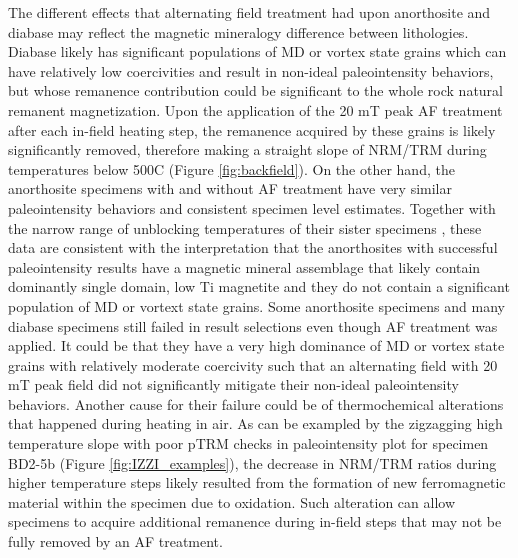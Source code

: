 \documentclass[draft]{agujournal2019}
\begin{document}
The different effects that alternating field treatment had upon anorthosite and diabase may reflect the magnetic mineralogy difference between lithologies. Diabase likely has significant populations of MD or vortex state grains which can have relatively low coercivities and result in non-ideal paleointensity behaviors, but whose remanence contribution could be significant to the whole rock natural remanent magnetization. Upon the application of the 20 mT peak AF treatment after each in-field heating step, the remanence acquired by these grains is likely significantly removed, therefore making a straight slope of NRM/TRM during temperatures below 500\textdegree C (Figure \ref{fig:backfield}). On the other hand, the anorthosite specimens with and without AF treatment have very similar paleointensity behaviors and consistent specimen level estimates. Together with the narrow range of unblocking temperatures of their sister specimens \cite{Zhang2021b}, these data are consistent with the interpretation that the anorthosites with successful paleointensity results have a magnetic mineral assemblage that likely contain dominantly single domain, low Ti magnetite and they do not contain a significant population of MD or vortext state grains. Some anorthosite specimens and many diabase specimens still failed in result selections even though AF treatment was applied. It could be that they have a very high dominance of MD or vortex state grains with relatively moderate coercivity such that an alternating field with 20 mT peak field did not significantly mitigate their non-ideal paleointensity behaviors. Another cause for their failure could be of thermochemical alterations that happened during heating in air. As can be exampled by the zigzagging high temperature slope with poor pTRM checks in paleointensity plot for specimen BD2-5b (Figure \ref{fig:IZZI_examples}), the decrease in NRM/TRM ratios during higher temperature steps likely resulted from the formation of new ferromagnetic material within the specimen due to oxidation. Such alteration can allow specimens to acquire additional remanence during in-field steps that may not be fully removed by an AF treatment.
\end{document}
